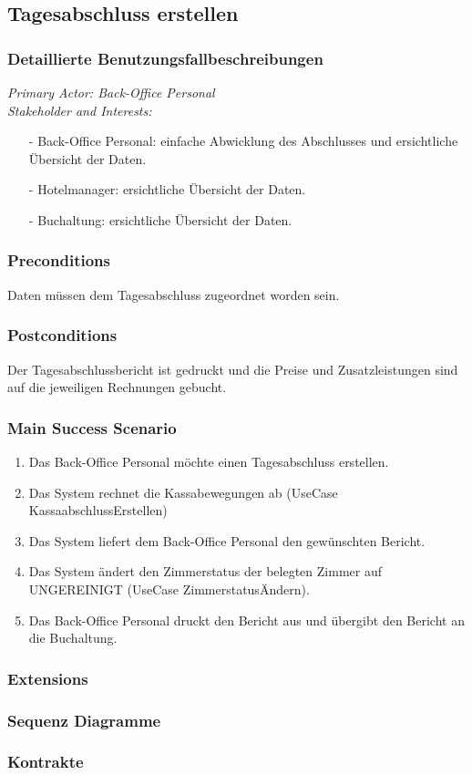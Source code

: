 \documentclass[./detailed_overview_usecases.tex]{subfiles}
\begin{document}
    \subsection{Tagesabschluss erstellen}
    \subsubsection{Detaillierte Benutzungsfallbeschreibungen}
    \textit{Primary Actor: Back-Office Personal}
    \\
    \textit{Stakeholder and Interests:}
    \begin{itemize}
        \item[-] Back-Office Personal: einfache Abwicklung des Abschlusses und ersichtliche Übersicht der Daten.
        \item[-] Hotelmanager: ersichtliche Übersicht der Daten.
        \item[-] Buchaltung: ersichtliche Übersicht der Daten.
    \end{itemize}

    \subsubsection*{Preconditions}
    Daten müssen dem Tagesabschluss zugeordnet worden sein.
    \subsubsection*{Postconditions}
    Der Tagesabschlussbericht ist gedruckt und die Preise und Zusatzleistungen sind auf die jeweiligen Rechnungen gebucht.

    \subsubsection*{Main Success Scenario}
    \begin{enumerate}
        \item Das Back-Office Personal möchte einen Tagesabschluss erstellen.
        \item Das System rechnet die Kassabewegungen ab (UseCase KassaabschlussErstellen)
        \item Das System liefert dem Back-Office Personal den gewünschten Bericht.
        \item Das System ändert den Zimmerstatus der belegten Zimmer auf UNGEREINIGT (UseCase ZimmerstatusÄndern).
        \item Das Back-Office Personal druckt den Bericht aus und übergibt den Bericht an die Buchaltung.
    \end{enumerate}

    \subsubsection*{Extensions}

    \subsubsection{Sequenz Diagramme}
    \subsubsection{Kontrakte}
\end{document}
